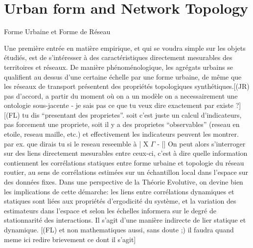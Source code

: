 

\newpage





\section{Urban form and Network Topology}{Forme Urbaine et Forme de Réseau}




\label{sec:staticcorrelations}





Une première entrée en matière empirique, et qui se voudra simple sur les objets étudiés, est de s'intéresser à des caractéristiques directement mesurables des territoires et réseaux. De manière phénoménologique, les agrégats urbains se qualifient au dessus d'une certaine échelle par une forme urbaine, de même que les réseaux de transport présentent des propriétés topologiques synthétiques.[(JR) pas d'accord, a partir du moment où on a un modèle on a necessairement une ontologie sous-jacente - je sais pas ce que tu veux dire exactement par existe ?][(FL) tu dis ``presentant des proprietes''. soit c'est juste un calcul d'indicateurs, pas forcement une propriete, soit il y a des proprietes ``observables'' (reseau en etoile, reseau maille, etc.) et effectivement les indicateurs peuvent les montrer. par ex. que dirais tu si le reseau reseemble à | X $\Gamma$ - |] On peut alors s'interroger sur des liens directement mesurables entre ceux-ci, c'est à dire quelle information contiennent les corrélations statiques entre forme urbaine et topologie du réseau routier, au sens de corrélations estimées sur un échantillon local dans l'espace sur des données fixes. Dans une perspective de la Théorie Evolutive, on devine bien les implications de cette démarche: les liens entre corrélations dynamiques et statiques sont liées aux propriétés d'ergodicité du système, et la variation des estimateurs dans l'espace et selon les échelles informera sur le degré de stationnarité des interactions. Il s'agit d'une manière indirecte de lier statique et dynamique. [(FL) et non mathematiques aussi, sans doute ;) il faudra quand meme ici redire brievement ce dont il s'agit]


